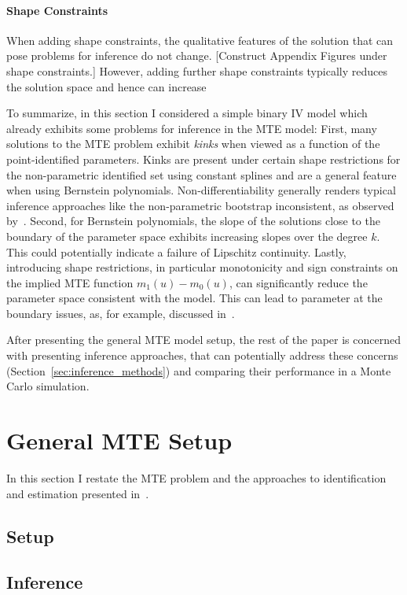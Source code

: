 \documentclass[12pt,a4paper,english]{article} %
\numberwithin{equation}{section}
\numberwithin{figure}{section}
\numberwithin{table}{section}
\begin{document}
\paragraph{Shape Constraints}
When adding shape constraints, the qualitative features of the solution that can pose problems for inference do not change.
[Construct Appendix Figures under shape constraints.]
However, adding further shape constraints typically reduces the solution space and hence can increase

To summarize, in this section I considered a simple binary IV model which already exhibits some problems for inference in the MTE model:
First, many solutions to the MTE problem exhibit \textit{kinks} when viewed as a function of the point-identified parameters.
Kinks are present under certain shape restrictions for the non-parametric identified set using constant splines and are a general feature when using Bernstein polynomials.
Non-differentiability generally renders typical inference approaches like the non-parametric bootstrap inconsistent, as observed by~\cite{dumbgen1993nondifferentiable}.
Second, for Bernstein polynomials, the slope of the solutions close to the boundary of the parameter space exhibits increasing slopes over the degree $k$.
This could potentially indicate a failure of Lipschitz continuity.
Lastly, introducing shape restrictions, in particular monotonicity and sign constraints on the implied MTE function $m_1(u) - m_0(u)$, can significantly reduce the parameter space consistent with the model.
This can lead to parameter at the boundary issues, as, for example, discussed in~\cite{andrews1999estimation}.

After presenting the general MTE model setup, the rest of the paper is concerned with presenting inference approaches, that can potentially address these concerns (Section~\ref{sec:inference_methods}) and comparing their performance in a Monte Carlo simulation.

\section{General MTE Setup}\label{sec:general_mte}
In this section I restate the MTE problem and the approaches to identification and estimation presented in~\cite{mogstad2018using}.
\subsection{Setup}

\subsection{Inference}
\end{document}
